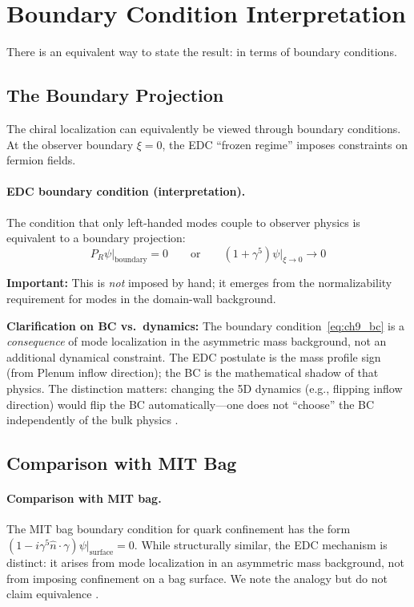 \section{Boundary Condition Interpretation}
\label{sec:ch9_boundary}

There is an equivalent way to state the result: in terms of boundary conditions.

\subsection{The Boundary Projection}

The chiral localization can equivalently be viewed through boundary conditions.
At the observer boundary $\xi = 0$, the EDC ``frozen regime'' imposes constraints
on fermion fields.

\paragraph{EDC boundary condition (interpretation).}
The condition that only left-handed modes couple to observer physics is
equivalent to a boundary projection:
\begin{equation}
    P_R \psi\big|_{\text{boundary}} = 0
    \qquad \text{or} \qquad
    (1 + \gamma^5) \psi\big|_{\xi \to 0} \to 0
    \label{eq:ch9_bc}
\end{equation}

\textbf{Important:} This is \emph{not} imposed by hand; it emerges from the
normalizability requirement for modes in the domain-wall background.

\textbf{Clarification on BC vs.\ dynamics:} The boundary condition~\eqref{eq:ch9_bc}
is a \emph{consequence} of mode localization in the asymmetric mass background, not
an additional dynamical constraint. The EDC postulate is the mass profile sign
(from Plenum inflow direction); the BC is the mathematical shadow of that physics.
The distinction matters: changing the 5D dynamics (e.g., flipping inflow direction)
would flip the BC automatically---one does not ``choose'' the BC independently of
the bulk physics \tagDc{}.

\subsection{Comparison with MIT Bag}

\paragraph{Comparison with MIT bag.}
The MIT bag boundary condition for quark confinement has the form
$(1 - i\gamma^5 \hat{n} \cdot \gamma)\psi|_{\text{surface}} = 0$.
While structurally similar, the EDC mechanism is distinct: it arises from
mode localization in an asymmetric mass background, not from imposing
confinement on a bag surface. We note the analogy but do not claim equivalence \tagI{}.

